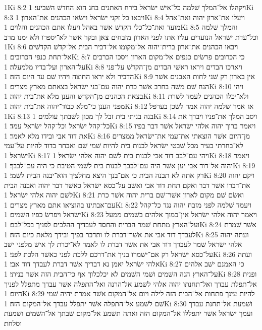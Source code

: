 1Ki 8:2  ויקהלו אל־המלך שׁלמה כל־אישׁ ישׂראל בירח האתנים בחג הוא החדשׁ השׁביעי׃
1Ki 8:3  ויבאו כל זקני ישׂראל וישׂאו הכהנים את־הארון׃
1Ki 8:4  ויעלו את־ארון יהוה ואת־אהל מועד ואת־כל־כלי הקדשׁ אשׁר באהל ויעלו אתם הכהנים והלוים׃
1Ki 8:5  והמלך שׁלמה וכל־עדת ישׂראל הנועדים עליו אתו לפני הארון מזבחים צאן ובקר אשׁר לא־יספרו ולא ימנו מרב׃
1Ki 8:6  ויבאו הכהנים את־ארון ברית־יהוה אל־מקומו אל־דביר הבית אל־קדשׁ הקדשׁים אל־תחת כנפי הכרובים׃
1Ki 8:7  כי הכרובים פרשׂים כנפים אל־מקום הארון ויסכו הכרבים על־הארון ועל־בדיו מלמעלה׃
1Ki 8:8  ויארכו הבדים ויראו ראשׁי הבדים מן־הקדשׁ על־פני הדביר ולא יראו החוצה ויהיו שׁם עד היום הזה׃
1Ki 8:9  אין בארון רק שׁני לחות האבנים אשׁר הנח שׁם משׁה בחרב אשׁר כרת יהוה עם־בני ישׂראל בצאתם מארץ מצרים׃
1Ki 8:10  ויהי בצאת הכהנים מן־הקדשׁ והענן מלא את־בית יהוה׃
1Ki 8:11  ולא־יכלו הכהנים לעמד לשׁרת מפני הענן כי־מלא כבוד־יהוה את־בית יהוה׃
1Ki 8:12  אז אמר שׁלמה יהוה אמר לשׁכן בערפל׃
1Ki 8:13  בנה בניתי בית זבל לך מכון לשׁבתך עולמים׃
1Ki 8:14  ויסב המלך את־פניו ויברך את כל־קהל ישׂראל וכל־קהל ישׂראל עמד׃
1Ki 8:15  ויאמר ברוך יהוה אלהי ישׂראל אשׁר דבר בפיו את דוד אבי ובידו מלא לאמר׃
1Ki 8:16  מן־היום אשׁר הוצאתי את־עמי את־ישׂראל ממצרים לא־בחרתי בעיר מכל שׁבטי ישׂראל לבנות בית להיות שׁמי שׁם ואבחר בדוד להיות על־עמי ישׂראל׃
1Ki 8:17  ויהי עם־לבב דוד אבי לבנות בית לשׁם יהוה אלהי ישׂראל׃
1Ki 8:18  ויאמר יהוה אל־דוד אבי יען אשׁר היה עם־לבבך לבנות בית לשׁמי הטיבת כי היה עם־לבבך׃
1Ki 8:19  רק אתה לא תבנה הבית כי אם־בנך היצא מחלציך הוא־יבנה הבית לשׁמי׃
1Ki 8:20  ויקם יהוה את־דברו אשׁר דבר ואקם תחת דוד אבי ואשׁב על־כסא ישׂראל כאשׁר דבר יהוה ואבנה הבית לשׁם יהוה אלהי ישׂראל׃
1Ki 8:21  ואשׂם שׁם מקום לארון אשׁר־שׁם ברית יהוה אשׁר כרת עם־אבתינו בהוציאו אתם מארץ מצרים׃
1Ki 8:22  ויעמד שׁלמה לפני מזבח יהוה נגד כל־קהל ישׂראל ויפרשׂ כפיו השׁמים׃
1Ki 8:23  ויאמר יהוה אלהי ישׂראל אין־כמוך אלהים בשׁמים ממעל ועל־הארץ מתחת שׁמר הברית והחסד לעבדיך ההלכים לפניך בכל־לבם׃
1Ki 8:24  אשׁר שׁמרת לעבדך דוד אבי את אשׁר־דברת לו ותדבר בפיך ובידך מלאת כיום הזה׃
1Ki 8:25  ועתה יהוה אלהי ישׂראל שׁמר לעבדך דוד אבי את אשׁר דברת לו לאמר לא־יכרת לך אישׁ מלפני ישׁב על־כסא ישׂראל רק אם־ישׁמרו בניך את־דרכם ללכת לפני כאשׁר הלכת לפני׃
1Ki 8:26  ועתה אלהי ישׂראל יאמן נא דבריך אשׁר דברת לעבדך דוד אבי׃
1Ki 8:27  כי האמנם ישׁב אלהים על־הארץ הנה השׁמים ושׁמי השׁמים לא יכלכלוך אף כי־הבית הזה אשׁר בניתי׃
1Ki 8:28  ופנית אל־תפלת עבדך ואל־תחנתו יהוה אלהי לשׁמע אל־הרנה ואל־התפלה אשׁר עבדך מתפלל לפניך היום׃
1Ki 8:29  להיות עינך פתחות אל־הבית הזה לילה ויום אל־המקום אשׁר אמרת יהיה שׁמי שׁם לשׁמע אל־התפלה אשׁר יתפלל עבדך אל־המקום הזה׃
1Ki 8:30  ושׁמעת אל־תחנת עבדך ועמך ישׂראל אשׁר יתפללו אל־המקום הזה ואתה תשׁמע אל־מקום שׁבתך אל־השׁמים ושׁמעת וסלחת׃
